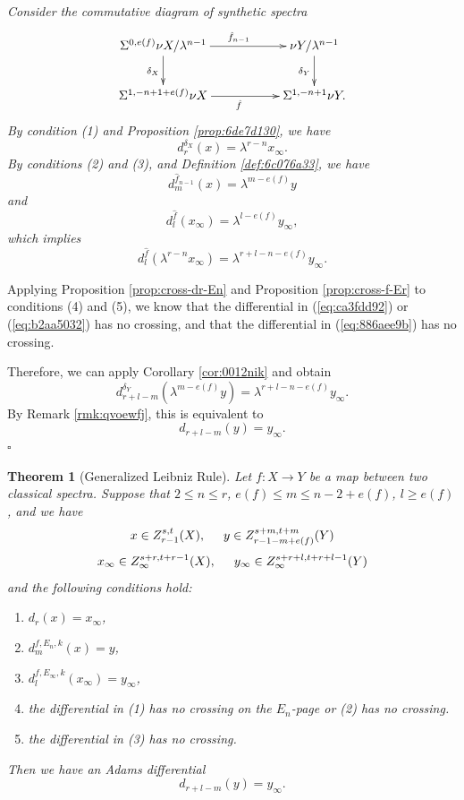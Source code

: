 \documentclass[12pt,a4paper]{article}
\renewenvironment{proof}{{\noindent\it\textbf{Proof}}\quad\it}{\hfill$\square$}
\newtheorem{theorem}[equation]{Theorem}
\newcommand{\Sus}{\Sigma}
\begin{document}
\begin{sloppy}
\begin{proof}
    Consider the commutative diagram of synthetic spectra
    $$\xymatrix{
        \Sus^{0,e(f)}\nu X/\lambda^{n-1} \ar[rr]^{\hat f_{n-1}}\ar[d]_{\delta_X} && \nu Y/\lambda^{n-1}\ar[d]_{\delta_Y}\\
        \Sus^{1,-n+1+e(f)} \nu X \ar[rr]_{\hat f} && \Sus^{1,-n+1}\nu Y.
    }$$
    By condition (1) and Proposition \ref{prop:6de7d130}, we have
    \begin{equation}\label{eq:ca3fdd92}
        d^{\delta_X}_r(x)=\lambda^{r-n}x_\infty.
    \end{equation}
    By conditions (2) and (3), and Definition \ref{def:6c076a33}, we have
    \begin{equation}\label{eq:b2aa5032}
        d^{\hat f_{n-1}}_m(x)=\lambda^{m-e(f)} y
    \end{equation}
    and
    \begin{equation*}
        d^{\hat f}_l(x_\infty)=\lambda^{l-e(f)} y_\infty,
    \end{equation*}
    which implies
    \begin{equation}\label{eq:886aee9b}
         d^{\hat f}_l(\lambda^{r-n}x_\infty)=\lambda^{r+l-n-e(f)}y_\infty.
    \end{equation}

    Applying Proposition \ref{prop:cross-dr-En} and Proposition \ref{prop:cross-f-Er} to conditions (4) and (5), we know that the differential in (\ref{eq:ca3fdd92}) or (\ref{eq:b2aa5032}) has no crossing, and that the differential in (\ref{eq:886aee9b}) has no crossing.

    Therefore, we can apply Corollary \ref{cor:0012nik} and obtain
    $$d^{\delta_Y}_{r+l-m}(\lambda^{m-e(f)} y)=\lambda^{r+l-n-e(f)} y_\infty.$$
    By Remark \ref{rmk:qvoewfj}, this is equivalent to
    $$d_{r+l-m}(y)= y_\infty.$$
\end{proof}

\begin{theorem}[Generalized Leibniz Rule]\label{thm:e73f481eB}
    Let $f: X\to Y$ be a map between two classical spectra.
    Suppose that $2\le n\le r$, $e(f)\le m\le n-2+e(f)$, $l\ge e(f)$, and we have
    $$x\in Z_{r-1}^{s,t}(X), \hspace{0.5cm} y\in Z_{r-1-m+e(f)}^{s+m,t+m}(Y)$$
    $$x_\infty\in Z_\infty^{s+r,t+r-1}(X), \hspace{0.5cm} y_\infty\in Z_\infty^{s+r+l,t+r+l-1}(Y)$$
    and the following conditions hold:
    \begin{enumerate}
        \item $d_{r}(x)=x_\infty$,
        \item $d_{m}^{f,E_n, k}(x)=y$,
        \item $d_{l}^{f,E_\infty, k}(x_\infty)=y_\infty$,
        \item the differential in (1) has no crossing on the $E_n$-page or (2) has no crossing.
        \item the differential in (3) has no crossing.%
    \end{enumerate}
    Then we have an Adams differential
    $$d_{r+l-m}(y)= y_\infty.$$
\end{theorem}


\end{sloppy}
\end{document}
